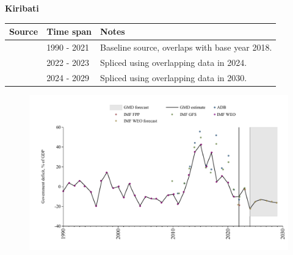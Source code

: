 \documentclass[12pt,a4paper,landscape]{article}
\begin{document}
\begin{adjustbox}{max totalsize={\paperwidth}{\paperheight},center}
\begin{minipage}[t][\textheight][t]{\textwidth}
\vspace*{0.5cm}
{}
\begin{center}
{\Large\bfseries Kiribati}
\end{center}
\vspace{0.5cm}
\begin{table}[H]
\centering
\small
\begin{tabular}{|l|l|l|}
\hline
\textbf{Source} & \textbf{Time span} & \textbf{Notes} \\
\hline
\rowcolor{white}\cite{IMF_WEO}& 1990 - 2021 &Baseline source, overlaps with base year 2018.\\
\rowcolor{lightgray}\cite{IMF_GFS}& 2022 - 2023 &Spliced using overlapping data in 2024.\\
\rowcolor{white}\cite{IMF_WEO_forecast}& 2024 - 2029 &Spliced using overlapping data in 2030.\\
\hline
\end{tabular}
\end{table}
\begin{figure}[H]
\centering
\includegraphics[width=\textwidth,height=0.6\textheight,keepaspectratio]{graphs/KIR_govdef_GDP.pdf}
\end{figure}
\end{minipage}
\end{adjustbox}
\end{document}
